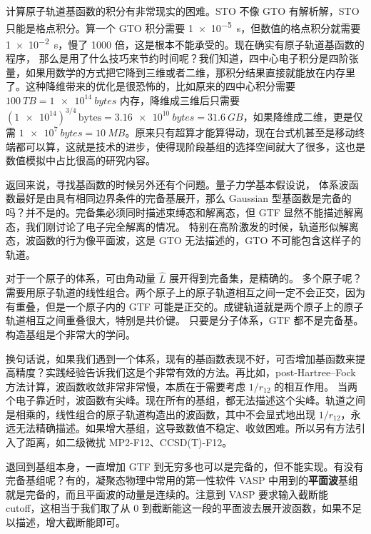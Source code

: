 计算原子轨道基函数的积分有非常现实的困难。STO 不像 GTO 有解析解，STO 只能是格点积分。算一个 GTO 积分需要 \SI{1e-5}{\second}，但数值的格点积分就需要 \SI{1e-2}{\second}，慢了 \num{1000} 倍，这是根本不能承受的。现在确实有原子轨道基函数的程序，
那么是用了什么技巧来节约时间呢？我们知道，四中心电子积分是四阶张量，如果用数学的方式把它降到三维或者二维，那积分结果直接就能放在内存里了。这种降维带来的优化是很恐怖的，比如原来的四中心积分需要 $\SI{100}{TB} = \SI{1e14}{bytes}$ 内存，降维成三维后只需要 $(\num{1e14})^{3/4}\,\text{bytes} = \SI{3.16e10}{bytes} = \SI{31.6}{GB}$，如果降维成二维，更是仅需 $\SI{1e7}{bytes} = \SI{10}{MB}$。原来只有超算才能算得动，现在台式机甚至是移动终端都可以算，这就是技术的进步，使得现阶段基组的选择空间就大了很多，这也是数值模拟中占比很高的研究内容。

返回来说，寻找基函数的时候另外还有个问题。量子力学基本假设说，
体系波函数最好是由具有相同边界条件的完备基展开，那么 Gaussian 型基函数是完备的吗？并不是的。完备集必须同时描述束缚态和解离态，但 GTF 显然不能描述解离态，我们刚讨论了电子完全解离的情况。
特别在高阶激发的时候，轨道形似解离态，波函数的行为像平面波，这是 GTO 无法描述的，GTO 不可能包含这样子的轨道。

对于一个原子的体系，可由角动量 $\hat L$ 展开得到完备集，是精确的。
多个原子呢？需要用原子轨道的线性组合。两个原子上的原子轨道相互之间一定不会正交，因为有重叠，但是一个原子内的 GTF 可能是正交的。成键轨道就是两个原子上的原子轨道相互之间重叠很大，特别是共价键。
只要是分子体系，GTF 都不是完备基。
构造基组是个非常大的学问。

换句话说，如果我们遇到一个体系，现有的基函数表现不好，可否增加基函数来提高精度？实践经验告诉我们这是个非常有效的方法。再比如，post-Hartree--Fock 方法计算，波函数收敛非常非常慢，本质在于需要考虑 $1/r_{12}$ 的相互作用。
当两个电子靠近时，波函数有尖峰。现在所有的基组，都无法描述这个尖峰。轨道之间是相乘的，线性组合的原子轨道构造出的波函数，其中不会显式地出现 $1/r_{12}$，永远无法精确描述。如果增大基组，这导致数值不稳定、收敛困难。所以另有方法引入了距离，如二级微扰 MP2-F12、CCSD(T)-F12。

退回到基组本身，一直增加 GTF 到无穷多也可以是完备的，但不能实现。有没有完备基组呢？有的，凝聚态物理中常用的第一性软件 VASP 中用到的\textbf{平面波}基组就是完备的，而且平面波的动量是连续的。注意到 VASP 要求输入截断能 cutoff，这相当于我们取了从 0 到截断能这一段的平面波去展开波函数，如果不足以描述，增大截断能即可。

